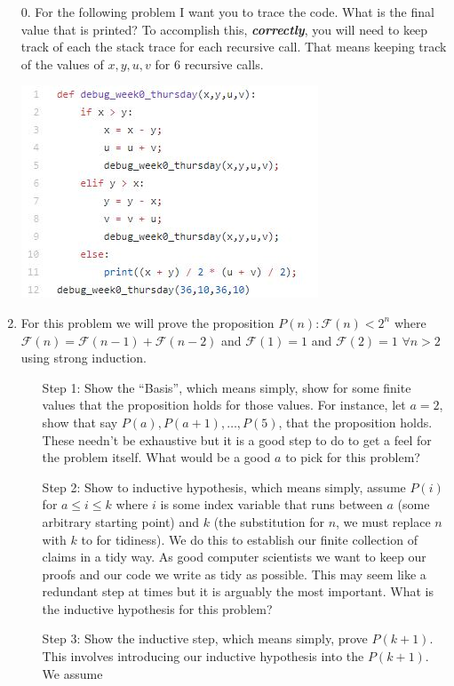\documentclass[12pt]{article}
\begin{document}
\begin{enumerate}
\item[0.] For the following problem I want you to trace the code. What is the final value that is printed? 
To accomplish this, \textit{\textbf{correctly}}, you will need to keep track of each the stack trace for each recursive call.
That means keeping track of the values of $x,y,u,v$ for $6$ recursive calls.
\centerline{\includegraphics{debug.JPG}} 
\newpage
\item For this problem we will prove the proposition $P(n):\mathscr{F}(n) < 2^n$ where 
$\mathscr{F}(n) = \mathscr{F}(n-1) + \mathscr{F}(n-2)$ and 
$\mathscr{F}(1)=1$ and $\mathscr{F}(2) = 1$ $\forall n > 2$ 
using strong induction. 
\begin{enumerate}
\item[Step 1:] Show the ``Basis'', which means simply, show for some finite 
values that the proposition holds for those values. For instance, let $a=2$, 
show that say $P(a),P(a+1),\dots, P(5)$, that the proposition holds. These needn't 
be exhaustive but it is a good step to do to get a feel for the problem itself. 
What would be a good $a$ to pick for this problem?
\item[Step 2:] Show to inductive hypothesis, which means simply, assume $P(i)$ 
for $a \le i \le k$ where $i$ is some index variable that runs between $a$ (some 
arbitrary starting point) and $k$ (the substitution for $n$, we must replace $n$
with $k$ to for tidiness). We do this to establish our finite collection of claims 
in a tidy way. As good computer scientists we want to keep our proofs and our code 
we write as tidy as possible. This may seem like a redundant step at times but it is 
arguably the most important. What is the inductive hypothesis for this problem?
\item[Step 3: ] Show the inductive step, which means simply, prove $P(k+1)$. This 
involves introducing our inductive hypothesis into the $P(k+1)$. We assume 

\end{enumerate}
\end{enumerate}
\end{document}
